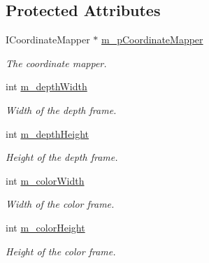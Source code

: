 \subsection*{Protected Attributes}
\begin{DoxyCompactItemize}
\item 
\hypertarget{class_output_streams_updater_stragedy_a3526d196182b8231f73ef97c49982579}{}I\+Coordinate\+Mapper $\ast$ \hyperlink{class_output_streams_updater_stragedy_a3526d196182b8231f73ef97c49982579}{m\+\_\+p\+Coordinate\+Mapper}\label{class_output_streams_updater_stragedy_a3526d196182b8231f73ef97c49982579}

\begin{DoxyCompactList}\small\item\em The coordinate mapper. \end{DoxyCompactList}\item 
\hypertarget{class_output_streams_updater_stragedy_a4fd7cb646232a330861a8bca67843611}{}int \hyperlink{class_output_streams_updater_stragedy_a4fd7cb646232a330861a8bca67843611}{m\+\_\+depth\+Width}\label{class_output_streams_updater_stragedy_a4fd7cb646232a330861a8bca67843611}

\begin{DoxyCompactList}\small\item\em Width of the depth frame. \end{DoxyCompactList}\item 
\hypertarget{class_output_streams_updater_stragedy_a4b8d71da2310776bc82874d7860f297a}{}int \hyperlink{class_output_streams_updater_stragedy_a4b8d71da2310776bc82874d7860f297a}{m\+\_\+depth\+Height}\label{class_output_streams_updater_stragedy_a4b8d71da2310776bc82874d7860f297a}

\begin{DoxyCompactList}\small\item\em Height of the depth frame. \end{DoxyCompactList}\item 
\hypertarget{class_output_streams_updater_stragedy_ad4d04daabc5670e974dea6044a34a806}{}int \hyperlink{class_output_streams_updater_stragedy_ad4d04daabc5670e974dea6044a34a806}{m\+\_\+color\+Width}\label{class_output_streams_updater_stragedy_ad4d04daabc5670e974dea6044a34a806}

\begin{DoxyCompactList}\small\item\em Width of the color frame. \end{DoxyCompactList}\item 
\hypertarget{class_output_streams_updater_stragedy_a6b2c11c6b802be2270a080fc72f3ff40}{}int \hyperlink{class_output_streams_updater_stragedy_a6b2c11c6b802be2270a080fc72f3ff40}{m\+\_\+color\+Height}\label{class_output_streams_updater_stragedy_a6b2c11c6b802be2270a080fc72f3ff40}

\begin{DoxyCompactList}\small\item\em Height of the color frame. \end{DoxyCompactList}\end{DoxyCompactItemize}


